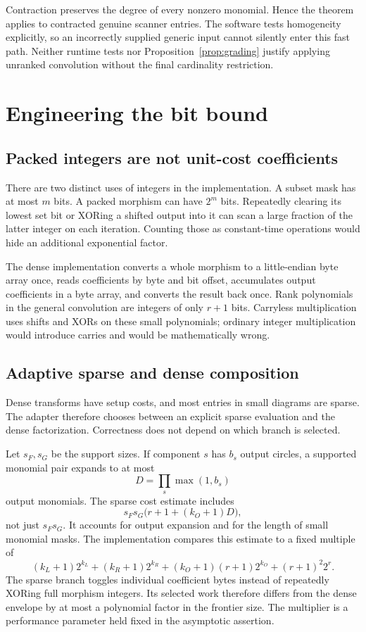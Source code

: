 Contraction preserves the degree of every nonzero monomial. Hence the
theorem applies to contracted genuine scanner entries. The software tests
homogeneity explicitly, so an incorrectly supplied generic input cannot
silently enter this fast path. Neither runtime tests nor
Proposition~\ref{prop:grading} justify applying unranked convolution
without the final cardinality restriction.

\section{Engineering the bit bound}
\label{sec:engineering}

\subsection{Packed integers are not unit-cost coefficients}

There are two distinct uses of integers in the implementation. A subset
mask has at most $m$ bits. A packed morphism can have $2^m$ bits. Repeatedly
clearing its lowest set bit or XORing a shifted output into it can scan a
large fraction of the latter integer on each iteration. Counting those
as constant-time operations would hide an additional exponential factor.

The dense implementation converts a whole morphism to a little-endian
byte array once, reads coefficients by byte and bit offset, accumulates
output coefficients in a byte array, and converts the result back once.
Rank polynomials in the general convolution are integers of only
$r+1$ bits. Carryless multiplication uses shifts and XORs on these small
polynomials; ordinary integer multiplication would introduce carries and
would be mathematically wrong.

\subsection{Adaptive sparse and dense composition}

Dense transforms have setup costs, and most entries in small diagrams
are sparse. The adapter therefore chooses between an explicit sparse
evaluation and the dense factorization. Correctness does not depend on
which branch is selected.

Let $s_F,s_G$ be the support sizes. If component $s$ has $b_s$ output
circles, a supported monomial pair expands to at most
\[
 D=\prod_s\max(1,b_s)
\]
output monomials. The sparse cost estimate includes
\[
 s_Fs_G\bigl(r+1+(k_O+1)D\bigr),
\]
not just $s_Fs_G$. It accounts for output expansion and for the length of
small monomial masks. The implementation compares this estimate to a
fixed multiple of
\[
 (k_L+1)2^{k_L}+(k_R+1)2^{k_R}
 +(k_O+1)(r+1)2^{k_O}+(r+1)^2 2^r.
\]
The sparse branch toggles individual coefficient bytes instead of
repeatedly XORing full morphism integers. Its selected work therefore
differs from the dense envelope by at most a polynomial factor in the
frontier size. The multiplier is a performance parameter held fixed in
the asymptotic assertion.


